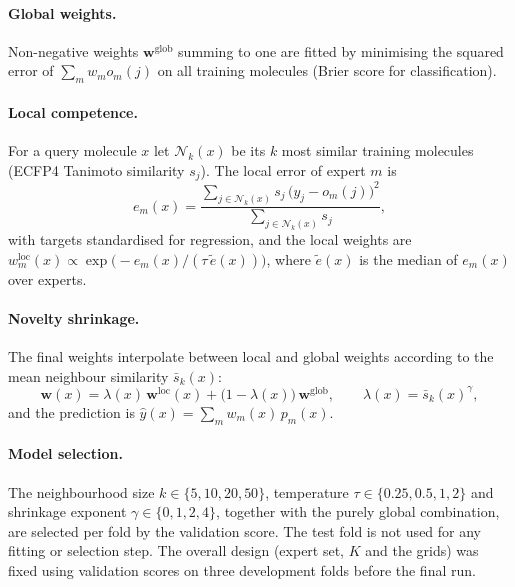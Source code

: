 \paragraph{Global weights.} Non-negative weights $\mathbf{w}^{\mathrm{glob}}$ summing to one are fitted by minimising the squared error of $\sum_m w_m o_m(j)$ on all training molecules (Brier score for classification).

\paragraph{Local competence.} For a query molecule $x$ let $\mathcal{N}_k(x)$ be its $k$ most similar training molecules (ECFP4 Tanimoto similarity $s_j$). The local error of expert $m$ is
\begin{equation}
e_m(x) = \frac{\sum_{j \in \mathcal{N}_k(x)} s_j\,\bigl(y_j - o_m(j)\bigr)^2}{\sum_{j \in \mathcal{N}_k(x)} s_j},
\end{equation}
with targets standardised for regression, and the local weights are $w^{\mathrm{loc}}_m(x) \propto \exp\!\bigl(-e_m(x) / (\tau\,\tilde{e}(x))\bigr)$, where $\tilde{e}(x)$ is the median of $e_m(x)$ over experts.

\paragraph{Novelty shrinkage.} The final weights interpolate between local and global weights according to the mean neighbour similarity $\bar{s}_k(x)$:
\begin{equation}
\mathbf{w}(x) = \lambda(x)\,\mathbf{w}^{\mathrm{loc}}(x) + \bigl(1 - \lambda(x)\bigr)\,\mathbf{w}^{\mathrm{glob}}, \qquad \lambda(x) = \bar{s}_k(x)^{\gamma},
\end{equation}
and the prediction is $\hat{y}(x) = \sum_m w_m(x)\,p_m(x)$.

\paragraph{Model selection.} The neighbourhood size $k \in \{5, 10, 20, 50\}$, temperature $\tau \in \{0.25, 0.5, 1, 2\}$ and shrinkage exponent $\gamma \in \{0, 1, 2, 4\}$, together with the purely global combination, are selected per fold by the validation score. The test fold is not used for any fitting or selection step. The overall design (expert set, $K$ and the grids) was fixed using validation scores on three development folds before the final run.

